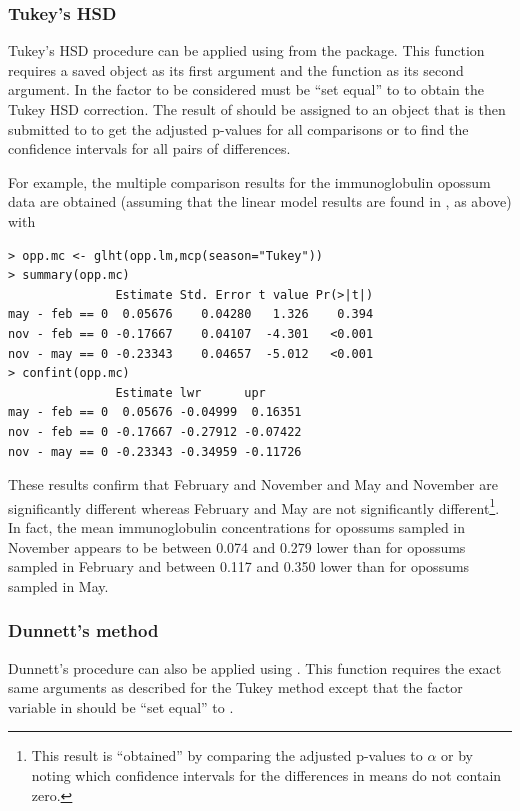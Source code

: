 \documentclass[10pt,openany]{book}\usepackage[]{graphicx}\usepackage[]{color}
\makeatletter
\newenvironment{kframe}{%
 \def\at@end@of@kframe{}%
 \ifinner\ifhmode%
  \def\at@end@of@kframe{\end{minipage}}%
  \begin{minipage}{\columnwidth}%
 \fi\fi%
 \def\FrameCommand##1{\hskip\@totalleftmargin \hskip-\fboxsep
 \colorbox{shadecolor}{##1}\hskip-\fboxsep
     \hskip-\linewidth \hskip-\@totalleftmargin \hskip\columnwidth}%
 \MakeFramed {\advance\hsize-\width
   \@totalleftmargin\z@ \linewidth\hsize
   \@setminipage}}%
 {\par\unskip\endMakeFramed%
 \at@end@of@kframe}
\newenvironment{knitrout}{}{} %
\makeatother
\begin{document}
\subsubsection*{Tukey's HSD}
Tukey's HSD procedure can be applied using  from the  package.  This function requires a saved  object as its first argument and the  function as its second argument.  In  the factor to be considered must be ``set equal'' to  to obtain the Tukey HSD correction.  The result of  should be assigned to an object that is then submitted to  to get the adjusted p-values for all comparisons or  to find the confidence intervals for all pairs of differences.

For example, the multiple comparison results for the immunoglobulin opossum data are obtained (assuming that the linear model results are found in , as above) with

\begin{knitrout}
\color{fgcolor}\begin{kframe}
\begin{verbatim}
> opp.mc <- glht(opp.lm,mcp(season="Tukey"))
> summary(opp.mc)
               Estimate Std. Error t value Pr(>|t|)
may - feb == 0  0.05676    0.04280   1.326    0.394
nov - feb == 0 -0.17667    0.04107  -4.301   <0.001
nov - may == 0 -0.23343    0.04657  -5.012   <0.001
> confint(opp.mc)
               Estimate lwr      upr     
may - feb == 0  0.05676 -0.04999  0.16351
nov - feb == 0 -0.17667 -0.27912 -0.07422
nov - may == 0 -0.23343 -0.34959 -0.11726
\end{verbatim}
\end{kframe}
\end{knitrout}
These results confirm that February and November and May and November are significantly different whereas February and May are not significantly different\footnote{This result is ``obtained'' by comparing the adjusted p-values to $\alpha$ or by noting which confidence intervals for the differences in means do not contain zero.}.  In fact, the mean immunoglobulin concentrations for opossums sampled in November appears to be between 0.074 and 0.279 lower than for opossums sampled in February and between 0.117 and 0.350 lower than for opossums sampled in May.


\subsubsection*{Dunnett's method}
Dunnett's procedure can also be applied using .  This function requires the exact same arguments as described for the Tukey method except that the factor variable in  should be ``set equal'' to .
\end{document}
